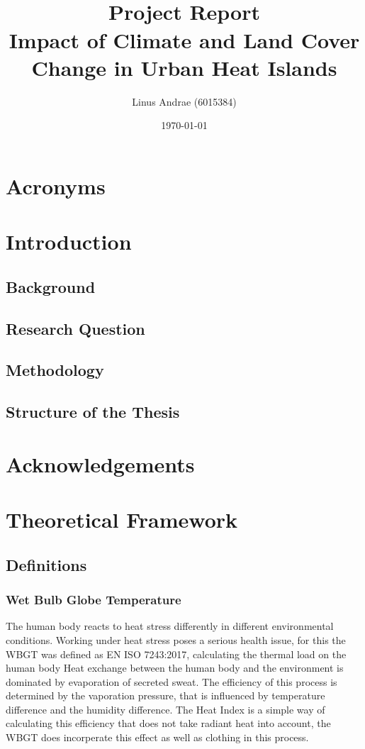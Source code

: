 \documentclass[a4paper, english]{article}
\title{\textit{} \\ \vspace{1cm}Project Report \\ \vspace{1cm} \textbf{\huge Impact of Climate and Land Cover Change in Urban Heat Islands}\\ \vspace{1.2cm} }
\author{Linus Andrae (6015384)}
\date{\today}
\begin{document}
  
  \newpage

  
  \newpage

  \tableofcontents
  \listoffigures
  \listoftables

  \section*{Acronyms}
  \printglossaries
\newpage

\section{Introduction}
    \subsection{Background}
   
    \subsection{Research Question}
    
    \subsection{Methodology}
    \subsection{Structure of the Thesis}

\section*{Acknowledgements}

\section{Theoretical Framework}
    \subsection{Definitions}
    
    \subsubsection{Wet Bulb Globe Temperature}
    The human body reacts to heat stress differently in different environmental conditions. 
    Working under heat stress poses a serious health issue, for this the \gls{WBGT} was defined as EN ISO 7243:2017, calculating the thermal load on the human body\cite{isoWBGT}
    Heat exchange between the human body and the environment is dominated by evaporation of secreted sweat.
    The efficiency of this process is determined by the vaporation pressure, that is influenced by temperature difference and the humidity difference. %
    The Heat Index is a simple way of calculating this efficiency that does not take radiant heat into account, the WBGT does incorperate this effect as well as clothing in this process. 
\end{document}
